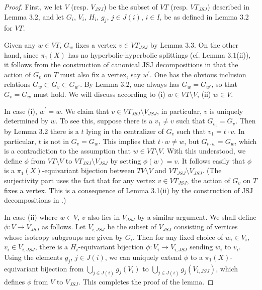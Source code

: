 \documentclass[11pt]{amsart}
\theoremstyle{plain}
\numberwithin{theorem}{section}
\theoremstyle{definition}
\begin{document}
\begin{proof}
First, we let $V$ (resp. $V_{JSJ}$) be the subset of $VT$ (resp. $VT_{JSJ}$) described in 
Lemma 3.2, and let $G_i$, $V_i$, $H_i$, $g_j$, $j\in J(i)$, $i\in I$, be as defined in 
Lemma 3.2 for $VT$. 

Given any $w\in VT$, $G_w$ fixes a vertex $v\in VT_{JSJ}$ by Lemma 3.3. On the other hand,
since $\pi_1(X)$ has no hyperbolic-hyperbolic splittings (cf. Lemma 3.1(ii)), it follows from the construction of canonical JSJ decompositions in \cite{RipS} that the action of $G_v$ on $T$ 
must also fix a vertex, say $w^\prime$. One has the obvious inclusion relations
$G_w\subset G_v\subset G_{w^\prime}$. By Lemma 3.2, one always has $G_w=G_{w^\prime}$,
so that $G_v=G_w$ must hold. We will discuss according to (i) $w\in VT\setminus V$, (ii) $w\in V$.

In case (i), $w^\prime=w$. We claim that $v\in VT_{JSJ}\setminus V_{JSJ}$, in particular, $v$ is uniquely determined by $w$. To see this, suppose there is a $v_1\neq v$ such that 
$G_{v_1}=G_v$. Then by Lemma 3.2
there is a $t$ lying in the centralizer of $G_v$ such that $v_1=t\cdot v$. In particular, $t$ is not
in $G_v=G_w$.  This implies that $t\cdot w\neq w$, but $G_{t\cdot w}=G_w$, which is a contradiction
to the assumption that $w\in VT\setminus V$.  With this understood, we define $\phi$ from 
$VT\setminus V$ to $VT_{JSJ}\setminus V_{JSJ}$ by setting $\phi(w)=v$.
It follows easily that $\phi$ is a $\pi_1(X)$-equivariant bijection
between $TV\setminus V$ and $VT_{JSJ}\setminus V_{JSJ}$. (The surjectivity part uses the fact
that for any vertex $v\in VT_{JSJ}$, the action of $G_v$ on $T$ fixes a vertex. This is a consequence
of Lemma 3.1(ii) by the construction of JSJ decompositions in \cite{RipS}.)

In case (ii) where $w\in V$, $v$ also lies in $V_{JSJ}$ by a similar argument. We shall define 
$\phi:V\rightarrow V_{JSJ}$ as follows. Let $V_{i,JSJ}$ be the subset of $V_{JSJ}$ consisting of
vertices whose isotropy subgroups are given by $G_i$. Then for any fixed choice of $w_i\in V_i$,
$v_i\in V_{i,JSJ}$, there is a $H_i$-equivariant bijection $\phi:V_i\rightarrow V_{i,JSJ}$ sending
$w_i$ to $v_i$. Using the elements $g_j$, $j\in J(i)$, we can uniquely extend $\phi$ to a
$\pi_1(X)$-equivariant bijection from $\bigcup_{j\in J(i)} g_j(V_i)$ to 
$\bigcup_{j\in J(i)} g_j(V_{i,JSJ})$, which defines $\phi$ from $V$ to $V_{JSJ}$. This completes
the proof of the lemma. 

\end{proof}
\end{document}
